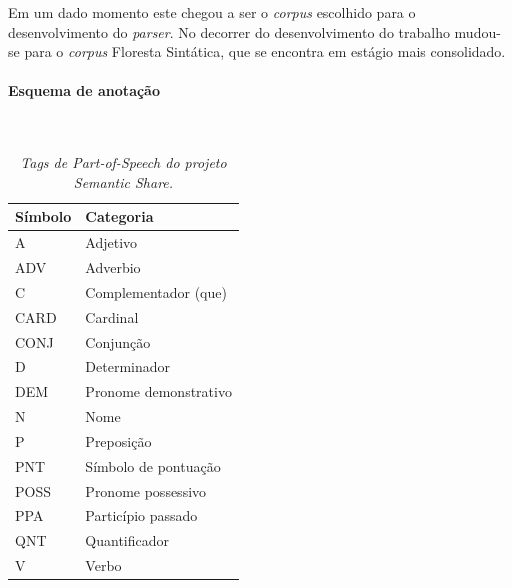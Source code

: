 Em um dado momento este chegou a ser o \emph{corpus} escolhido para o desenvolvimento do \emph{parser}. No decorrer do desenvolvimento do trabalho mudou-se para o \emph{corpus} Floresta Sintática, que se encontra em estágio mais consolidado.

\paragraph{Esquema de anotação}\label{sub:semantic_anotacao}\hspace*{1in}\\


\begin{table}

   \centering
   \small
   \caption{\it Tags de \emph{Part-of-Speech} do projeto Semantic Share.}

    \begin{tabular}{ | p{3cm} | p{10cm} | }
      \hline
        \textbf{Símbolo} & \textbf{Categoria}\\
        \hline
        \hline

    A&Adjetivo\\
    \hline
    ADV&Adverbio\\
    \hline
    C&Complementador (que)\\
    \hline
    CARD&Cardinal\\
    \hline
    CONJ&Conjunção\\
    \hline
    D&Determinador\\
    \hline
    DEM&Pronome demonstrativo\\
    \hline
    N&Nome\\
    \hline
    P&Preposição\\
    \hline
    PNT&Símbolo de pontuação\\
    \hline
    POSS&Pronome possessivo\\
    \hline
    PPA&Particípio passado\\
    \hline
    QNT& Quantificador\\
    \hline
    V& Verbo\\
    \hline


   \end{tabular}
\label{tbl:semantic_share_pos}      
\end{table}



